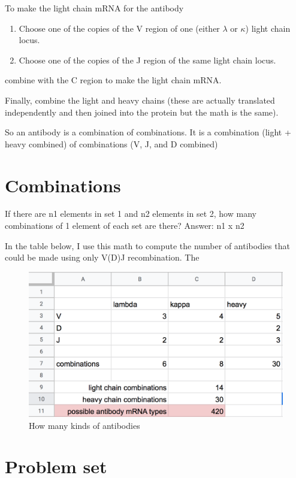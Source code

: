 \documentclass[]{book}
\begin{document}
To make the light chain mRNA for the antibody

\begin{enumerate}
\def\labelenumi{\arabic{enumi}.}
\item
  Choose one of the copies of the V region of one (either \(\lambda\) or
  \(\kappa\)) light chain locus.
\item
  Choose one of the copies of the J region of the same light chain
  locus.
\end{enumerate}

combine with the C region to make the light chain mRNA.

Finally, combine the light and heavy chains (these are actually
translated independently and then joined into the protein but the math
is the same).

So an antibody is a combination of combinations. It is a combination
(light + heavy combined) of combinations (V, J, and D combined)

\section{Combinations}\label{combinations}

If there are n1 elements in set 1 and n2 elements in set 2, how many
combinations of 1 element of each set are there? Answer: n1 x n2

In the table below, I use this math to compute the number of antibodies
that could be made using only V(D)J recombination. The

\begin{figure}

{\centering \includegraphics[width=0.8\linewidth]{images/vdj} 

}

\caption{How many kinds of antibodies}\label{fig:vdj}
\end{figure}

\section{Problem set}\label{problem-set-2}
\end{document}

